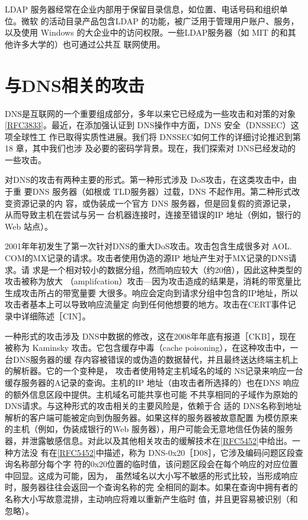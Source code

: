LDAP 服务器经常在企业内部用于保留目录信息，如位置、电话号码和组织单位。微软
的活动目录产品包含LDAP 的功能，被广泛用于管理用户账户、服务，以及使用 Windows
的大企业中的访问权限。一些LDAP服务器（如 MIT 的和其他许多大学的）也可通过公共互
联网使用。

\section{与DNS相关的攻击}

DNS是互联网的一个重要组成部分，多年以来它已经成为一些攻击和对策的对象
\href{https://www.rfc-editor.org/rfc/rfc3833}{[RFC3833]}。最近，在添加强认证到 DNS操作中方面，DNS 安全（DNSSEC）这项全球性工
作已取得实质性进展。我们将 DNSSEC如何工作的详细讨论推迟到第18 章，其中我们也涉
及必要的密码学背景。现在，我们探索对 DNS已经发动的一些攻击。

对DNS的攻击有两种主要的形式。第一种形式涉及 DoS攻击，在这类攻击中，由于重
要DNS 服务器（如根或 TLD服务器）过载，DNS 不起作用。第二种形式改变资源记录的内
容，或伪装成一个官方 DNS 服务器，但是回复假的资源记录，从而导致主机在尝试与另一
台机器连接时，连接至错误的IP 地址（例如，银行的Web 站点）。

2001年年初发生了第一次针对DNS的重大DoS攻击。攻击包含生成很多对 AOL.
COM的MX记录的请求。攻击者使用伪造的源IP 地址产生对于MX记录的DNS请求。请
求是一个相对较小的数据分组，然而响应较大（约20倍），因此这种类型的攻击被称为放大
（amplifcation）攻击—因为攻击造成的结果是，消耗的带宽量比生成攻击所占的带宽量要
大很多。响应会定向到请求分组中包含的IP地址，所以攻击者基本上可以导致响应流量定
向到任何他想要的地方。攻击在CERT事件记录中详细陈述［CIN］。

一种形式的攻击涉及 DNS中数据的修改，这在2008年年底有报道［CKB］，现在被称为
Kaminsky 攻击。它包含缓存中毒（cache poisoning），在这种攻击中，一台DNS服务器的缓
存内容被错误的或伪造的数据替代，并且最终送达终端主机上的解析器。它的一个变种是，
攻击者使用特定主机域名的域的 NS记录来响应一台缓存服务器的A记录的查询。主机的IP
地址（由攻击者所选择的）也在DNS 响应的额外信息区段中提供。主机域名可能共享也可能
不共享相同的子域作为原始的 DNS请求。与这种形式的攻击相关的主要风险是，依赖于合
适的 DNS名称到地址解析的客户端可能被定向到伪服务器。如果这样的服务器被故意配置
为模仿原来的主机（例如，伪装成银行的Web 服务器），用户可能会无意地信任伪装的服务
器，并泄露敏感信息。对此以及其他相关攻击的缓解技术在\href{https://www.rfc-editor.org/rfc/rfc5452}{[RFC5452]}中给出。一种方法没
有在\href{https://www.rfc-editor.org/rfc/rfc5452}{[RFC5452]}中描述，称为 DNS-0x20［D08］，它涉及编码问题区段查询名称部分每个字
符的0x20位置的临时值，该问题区段会在每个响应的对应位置中回显。这成为可能，因为，
虽然域名以大小写不敏感的形式比较，当形成响应时，服务器往往会返回一个查询名称的完
全相同的副本。如果在查询中拥有者的名称大小写故意混排，主动响应将难以重新产生临时
值，并且更容易被识别（和忽略）。

